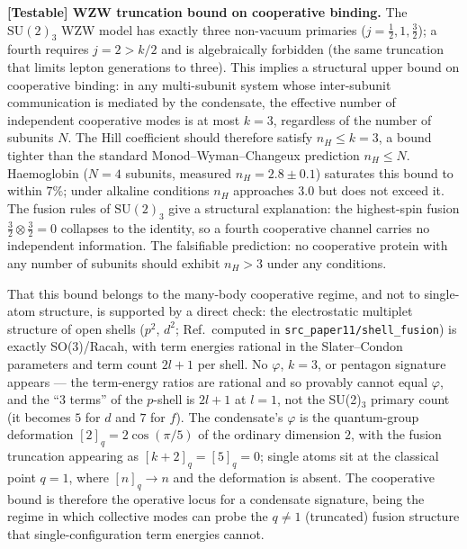 \documentclass[11pt,a4paper]{article}
\theoremstyle{definition}
\theoremstyle{remark}
\newcommand{\vp}{\varphi}
\begin{document}
\begin{enumerate}[label=\textbf{[\arabic*]}, leftmargin=*, noitemsep]
\item \textbf{[Testable] WZW truncation bound on cooperative binding.}
The $\mathrm{SU}(2)_3$ WZW model has exactly three non-vacuum primaries
($j=\tfrac{1}{2},1,\tfrac{3}{2}$); a fourth requires $j=2>k/2$ and is
algebraically forbidden (the same truncation that limits lepton generations
to three). This implies a structural upper bound on cooperative binding:
in any multi-subunit system whose inter-subunit communication is mediated
by the condensate, the effective number of independent cooperative modes
is at most $k=3$, regardless of the number of subunits $N$.
The Hill coefficient should therefore satisfy $n_H \leq k = 3$,
a bound tighter than the standard Monod--Wyman--Changeux prediction
$n_H \leq N$.
Haemoglobin ($N=4$ subunits, measured $n_H = 2.8 \pm 0.1$)
saturates this bound to within $7\%$;
under alkaline conditions $n_H$ approaches $3.0$ but does not exceed it.
The fusion rules of $\mathrm{SU}(2)_3$ give a structural explanation:
the highest-spin fusion $\tfrac{3}{2}\otimes\tfrac{3}{2}=0$ collapses
to the identity, so a fourth cooperative channel carries no independent
information.
The falsifiable prediction: no cooperative protein with any number of
subunits should exhibit $n_H > 3$ under any conditions.

That this bound belongs to the many-body cooperative regime, and not to
single-atom structure, is supported by a direct check: the
electrostatic multiplet structure of open shells ($p^2$, $d^2$;
Ref.~computed in \texttt{src\_paper11/shell\_fusion}) is exactly
SO(3)/Racah, with term energies rational in the Slater--Condon
parameters and term count $2l+1$ per shell.  No $\vp$, $k=3$, or
pentagon signature appears --- the term-energy ratios are rational and
so provably cannot equal $\vp$, and the ``$3$ terms'' of the $p$-shell
is $2l+1$ at $l=1$, not the SU(2)$_3$ primary count (it becomes $5$ for
$d$ and $7$ for $f$).  The condensate's $\vp$ is the quantum-group
deformation $[2]_q = 2\cos(\pi/5)$ of the ordinary dimension $2$, with
the fusion truncation appearing as $[k+2]_q = [5]_q = 0$; single atoms
sit at the classical point $q=1$, where $[n]_q \to n$ and the
deformation is absent.  The cooperative bound is therefore the operative
locus for a condensate signature, being the regime in which collective
modes can probe the $q \neq 1$ (truncated) fusion structure that
single-configuration term energies cannot.

\end{enumerate}

\end{document}

